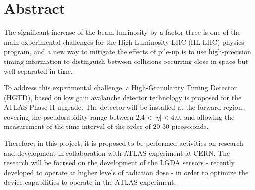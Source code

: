 \chapter*{Abstract}


The significant increase of the beam luminosity by a factor three \cite{HL_LHC,tdr} is one of the main experimental challenges for the High Luminosity LHC (HL-LHC) physics program, and a new way to mitigate the effects of pile-up is to use high-precision timing information to distinguish between collisions occurring close in space but well-separated in time.

To address this experimental challenge, a High-Granularity Timing Detector (HGTD), based on low gain avalanche detector technology is proposed for the ATLAS Phase-II upgrade. The detector will be installed at the forward region, covering the pseudorapidity range between $2.4< |\eta| <4.0$, and allowing the measurement of the time interval of the order of 20-30 picoseconds.


Therefore, in this project, it is proposed to be performed activities on research and development in collaboration with ATLAS experiment at CERN. The research will be focused on the development of the LGDA sensors - recently developed to operate at higher levels of radiation dose \cite{JIN_LGAD,NIMA_LGAD,NIMA_LGAD_I,NIMA_LGAD_II,NIMA_LGAD_III} - in order to optimize the device capabilities to operate in the ATLAS experiment. %